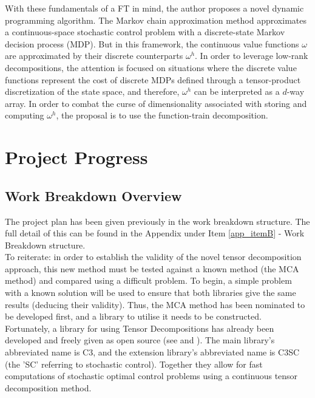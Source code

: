 \documentclass[11pt,draftd]{article}
\begin{document}
\noindent With these fundamentals of a FT in mind, the author proposes a novel dynamic programming algorithm. The Markov chain approximation method approximates a continuous-space stochastic control problem with a discrete-state Markov decision process (MDP). But in this framework, the continuous value functions $ \omega $ are approximated by their discrete counterparts $ \omega^{h} $. In order to leverage low-rank decompositions, the attention is focused on situations where the discrete value functions represent the cost of discrete MDPs defined through a tensor-product discretization of the state space, and therefore, $ \omega^{h} $ can be interpreted as a $ d $-way array. In order to combat the curse of dimensionality associated with storing and computing $ \omega^{h} $, the proposal is to use the function-train decomposition.
\fi
\newpage


\section{Project Progress} \label{ProjectProgress}
\subsection{Work Breakdown Overview}
The project plan has been given previously in the work breakdown structure. The full detail of this can be found in the Appendix under Item \ref{app_itemB} - Work Breakdown structure. \\

\noindent To reiterate: in order to establish the validity of the novel tensor decomposition approach, this new method must be tested against a known method (the MCA method) and compared using a difficult problem. To begin, a simple problem with a known solution will be used to ensure that both libraries give the same results (deducing their validity). Thus, the MCA method has been nominated to be developed first, and a library to utilise it needs to be constructed. \\

\noindent Fortunately, a library for using Tensor Decompositions has already been developed and freely given as open source (see \cite{c3c} and \cite{c3cs}). The main library's abbreviated name is C3, and the extension library’s abbreviated name is C3SC (the 'SC' referring to stochastic control). Together they allow for fast computations of stochastic optimal control problems using a continuous tensor decomposition method. \\
\end{document}
